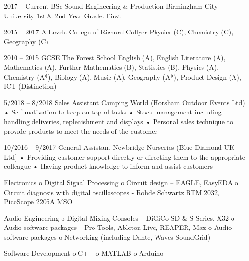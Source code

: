 \documentclass[9pt]{developercv} %
\begin{document}


\begin{entrylist}
	\entry
		{2017 -- Current}
		{BSc Sound Engineering \& Production}
		{Birmingham City University}
		{1st \& 2nd Year Grade: First}
		
	\entry
	{2015 -- 2017}
	{A Levels}
	{College of Richard Collyer}
	{Physics (C), Chemistry (C), Geography (C)}
	

	\entry
	{2010 -- 2015}
	{GCSE}
	{The Forest School}
	{English (A), English Literature (A), Mathematics (A), Further Mathematics (B), Statistics (B), Physics (A), Chemistry (A*), Biology (A), Music
(A), Geography (A*), Product Design (A), ICT (Distinction)}

\end{entrylist}


\begin{entrylist}
	\entry
		{5/2018 -- 8/2018}
		{Sales Assistant}
		{Camping World (Horsham Outdoor Events Ltd)}
		{• Self-motivation to keep on top of tasks
\newline• Stock management including handling deliveries, replenishment and displays
\newline• Personal sales technique to provide products to meet the needs of the customer}
		
	\entry
		{10/2016 -- 9/2017}
		{General Assistant}
		{Newbridge Nurseries (Blue Diamond UK Ltd)}
		{• Providing customer support directly or directing them to the appropriate colleague
\newline• Having product knowledge to inform and assist customers}

\end{entrylist}

\begin{entrylist}
\entry
		{}
		{Electronics}
		{}
		{o Digital Signal Processing
\newline o Circuit design – EAGLE, EasyEDA
\newline o Circuit diagnosis with digital oscilloscopes - Rohde Schwartz RTM 2032, PicoScope 2205A MSO}

\entry
		{}
		{Audio Engineering}
		{}
		{o Digital Mixing Consoles – DiGiCo SD \& S-Series, X32
\newline o Audio software packages – Pro Tools, Ableton Live, REAPER, Max
\newline o Audio software packages
\newline o Networking (including Dante, Waves SoundGrid)}

\entry
		{}
		{Software Development}
		{}
		{o C++
\newline o MATLAB
\newline o Arduino}
		
	\end{entrylist}
\end{document}
